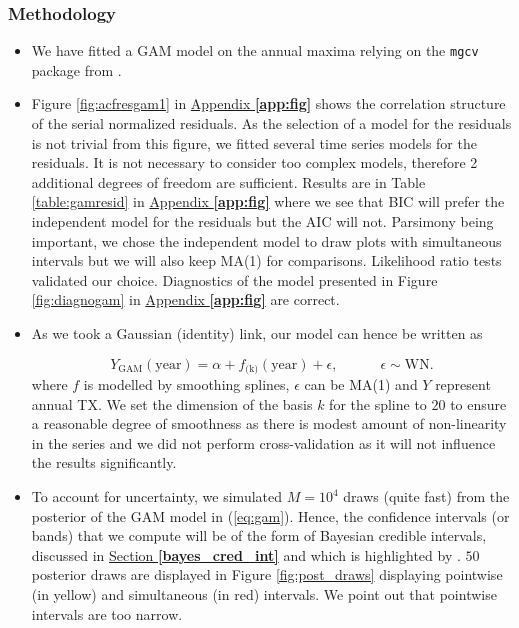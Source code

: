 \subsubsection*{Methodology}

\begin{itemize}
\item We have fitted a GAM model on the annual maxima relying on the \texttt{mgcv} package from \citet{maindonald_data_2006}.

\item  Figure \ref{fig:acfresgam1} in \hyperref[app:fig]{Appendix \textbf{\ref{app:fig}}} shows the correlation structure of the serial normalized residuals. As the selection of a model for the residuals is not trivial from this figure, we fitted several time series models for the residuals. It is not necessary to consider too complex models, therefore 2 additional degrees of freedom are sufficient. Results are in Table \ref{table:gamresid} in \hyperref[app:fig]{Appendix \textbf{\ref{app:fig}}} where we see that BIC will prefer the independent model for the residuals but the AIC will not. Parsimony being important, we chose the independent model to draw plots with simultaneous intervals but we will also keep MA(1) for comparisons. Likelihood ratio tests validated our choice. Diagnostics of the model presented in Figure \ref{fig:diagnogam} in \hyperref[app:fig]{Appendix \textbf{\ref{app:fig}}} are correct.

\item As we took a Gaussian (identity) link, our model can hence be written as

\begin{equation}\label{eq:gam}
Y_{\text{GAM}}(\text{year}) = \alpha + f_{\text{(k)}}(\text{year})+\epsilon , \qquad\quad \epsilon\sim\text{WN}.
\end{equation}
where $f$ is modelled by smoothing splines, $\epsilon$ can be MA(1) and $Y$ represent annual TX. We set the dimension of the basis $k$ for the spline to $20$ to ensure a reasonable degree of smoothness as there is modest amount of non-linearity in the series and we did not perform cross-validation as it will not influence the results significantly. 

\item  To account for uncertainty, we simulated $M = 10^4$ draws (quite fast) from the posterior of the GAM model in (\ref{eq:gam}). Hence, the confidence intervals (or bands) that we compute will be of the form of Bayesian credible intervals,  discussed in \hyperref[bayes_cred_int]{Section \textbf{\ref{bayes_cred_int}}} and which is highlighted by \citet{marra_coverage_2012}.
$50$ posterior draws are displayed in Figure \ref{fig:post_draws} %
 displaying pointwise (in yellow) and simultaneous (in red) intervals. We point out that pointwise intervals are too narrow.
\end{itemize}

